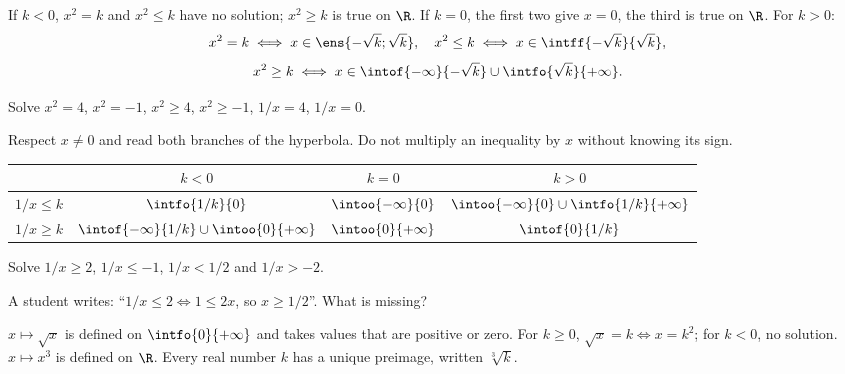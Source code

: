 \begin{keypoint}
If $k<0$, $x^2=k$ and $x^2\leq k$ have no solution; $x^2\geq k$ is true on $\R$. If $k=0$, the first two give $x=0$, the third is true on $\R$. For $k>0$:
\[x^2=k\iff x\in\ens{-\sqrt k;\sqrt k},\quad x^2\leq k\iff x\in\intff{-\sqrt k}{\sqrt k},\]
\[x^2\geq k\iff x\in\intof{-\infty}{-\sqrt k}\cup\intfo{\sqrt k}{+\infty}.\]
\end{keypoint}
\begin{example}Solve $x^2=4$, $x^2=-1$, $x^2\geq4$, $x^2\geq-1$, $1/x=4$, $1/x=0$.\end{example}
\begin{method}
Respect $x\ne0$ and read both branches of the hyperbola. Do not multiply an inequality by $x$ without knowing its sign.
\end{method}
\begin{center}\small{}\begin{tabular}{c|c|c|c}
&$k<0$&$k=0$&$k>0$\\\hline
$1/x\leq k$&$\intfo{1/k}{0}$&$\intoo{-\infty}{0}$&$\intoo{-\infty}{0}\cup\intfo{1/k}{+\infty}$\\
$1/x\geq k$&$\intof{-\infty}{1/k}\cup\intoo{0}{+\infty}$&$\intoo{0}{+\infty}$&$\intof{0}{1/k}$
\end{tabular}\end{center}
\begin{example}Solve $1/x\geq2$, $1/x\leq-1$, $1/x<1/2$ and $1/x>-2$.\end{example}
\begin{example}A student writes: ``$1/x\leq2\iff1\leq2x$, so $x\geq1/2$''. What is missing?\end{example}
\begin{keypoint}[Definitions]
$x\mapsto\sqrt x$ is defined on $\intfo{0}{+\infty}$ and takes values that are positive or zero. For $k\geq0$, $\sqrt x=k\iff x=k^2$; for $k<0$, no solution.
$x\mapsto x^3$ is defined on $\R$. Every real number $k$ has a unique preimage, written $\sqrt[3]{k}$.
\end{keypoint}
